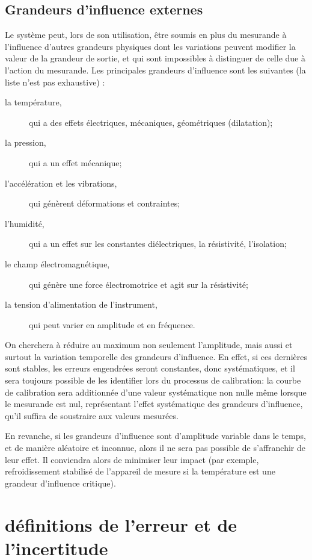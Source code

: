 \subsection{Grandeurs d'influence externes}

Le système peut, lors de son utilisation, être soumis en plus du mesurande à l'influence d'autres grandeurs physiques dont les variations peuvent modifier la valeur de la grandeur de sortie, et qui sont impossibles à distinguer de celle due à l'action du mesurande. Les principales grandeurs d'influence sont les suivantes (la liste n'est pas exhaustive) :
\begin{description}
    \item[la température,] qui a des effets électriques, mécaniques, géométriques (dilatation);
    \item[la pression,] qui a un effet mécanique;
    \item[l'accélération et les vibrations,] qui génèrent déformations et contraintes;
    \item[l'humidité,] qui a un effet sur les constantes diélectriques, la résistivité, l'isolation;
    \item[le champ électromagnétique,] qui génère une force électromotrice et agit sur la résistivité;
    \item[la tension d'alimentation de l'instrument,] qui peut varier en amplitude et en fréquence.
\end{description}
On cherchera à réduire au maximum non seulement l'amplitude, mais aussi et surtout la variation temporelle des grandeurs d'influence. En effet, si ces dernières sont stables, les erreurs engendrées seront constantes, donc systématiques, et il sera toujours possible de les identifier lors du processus de calibration: la courbe de calibration sera additionnée d'une valeur systématique non nulle même lorsque le mesurande est nul, représentant l'effet systématique des grandeurs d'influence, qu'il suffira de soustraire aux valeurs mesurées.

En revanche, si les grandeurs d'influence sont d'amplitude variable dans le temps, et de manière aléatoire et inconnue, alors il ne sera pas possible de s'affranchir de leur effet. Il conviendra alors de minimiser leur impact (par exemple, refroidissement stabilisé de l'appareil de mesure si la température est une grandeur d'influence critique).

\section{définitions de l'erreur et de l'incertitude}

